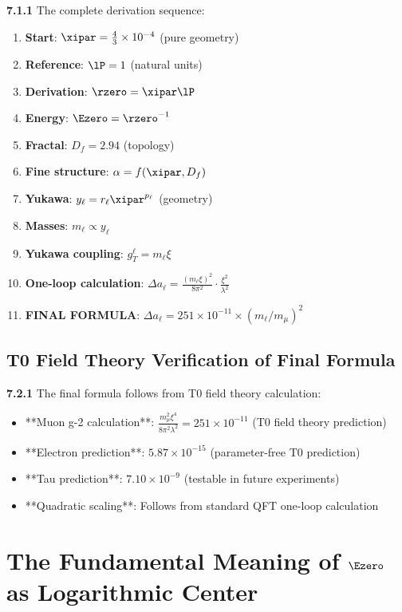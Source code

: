 	\noindent \textbf{7.1.1} The complete derivation sequence:
	\begin{enumerate}
		\item \textbf{Start}: $\xipar = \frac{4}{3} \times 10^{-4}$ (pure geometry)
		\item \textbf{Reference}: $\lP = 1$ (natural units)
		\item \textbf{Derivation}: $\rzero = \xipar \lP$
		\item \textbf{Energy}: $\Ezero = \rzero^{-1}$
		\item \textbf{Fractal}: $D_f = 2.94$ (topology)
		\item \textbf{Fine structure}: $\alpha = f(\xipar, D_f)$
		\item \textbf{Yukawa}: $y_\ell = r_\ell \xipar^{p_\ell}$ (geometry)
		\item \textbf{Masses}: $m_\ell \propto y_\ell$
		\item \textbf{Yukawa coupling}: $g_T^\ell = m_\ell \xi$
		\item \textbf{One-loop calculation}: $\Delta a_\ell = \frac{(m_\ell \xi)^2}{8\pi^2} \cdot \frac{\xi^2}{\lambda^2}$
		\item \textbf{FINAL FORMULA}: $\Delta a_\ell = 251 \times 10^{-11} \times (m_\ell/m_\mu)^2$
	\end{enumerate}
	
	\subsection{T0 Field Theory Verification of Final Formula}
	
	\noindent \textbf{7.2.1} The final formula follows from T0 field theory calculation:
	\begin{itemize}
		\item **Muon g-2 calculation**: $\frac{m_\mu^2 \xi^4}{8\pi^2 \lambda^2} = 251 \times 10^{-11}$ (T0 field theory prediction)
		\item **Electron prediction**: $5.87 \times 10^{-15}$ (parameter-free T0 prediction)
		\item **Tau prediction**: $7.10 \times 10^{-9}$ (testable in future experiments)
		\item **Quadratic scaling**: Follows from standard QFT one-loop calculation
	\end{itemize}
	
\section{The Fundamental Meaning of $\Ezero$ as Logarithmic Center}

